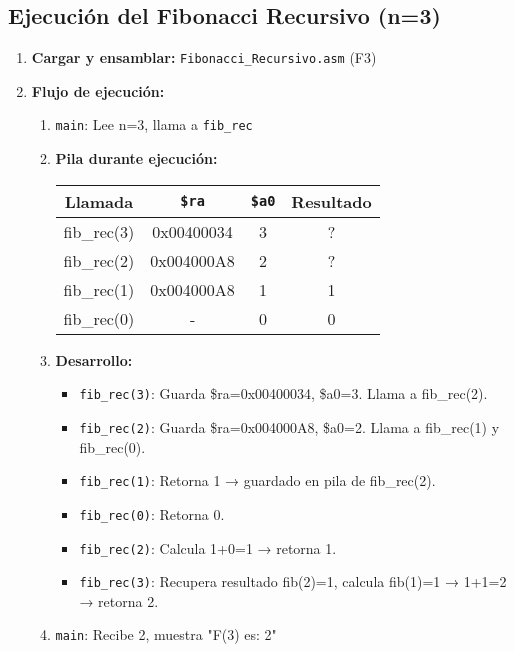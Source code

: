 \documentclass[a4paper, 12pt]{article}
\begin{document}
\subsection{Ejecución del Fibonacci Recursivo (n=3)}
\begin{enumerate}
    \item \textbf{Cargar y ensamblar:} \texttt{Fibonacci\_Recursivo.asm} (F3)
    \item \textbf{Flujo de ejecución:}
        \begin{enumerate}
            \item \texttt{main}: Lee n=3, llama a \texttt{fib\_rec}
            \item \textbf{Pila durante ejecución:}
                \begin{table}[h]
                    \centering
                    \begin{tabular}{|c|c|c|c|}
                        \hline
                        \textbf{Llamada} & \texttt{\$ra} & \texttt{\$a0} & \textbf{Resultado} \\
                        \hline
                        fib\_rec(3) & 0x00400034 & 3 & ? \\
                        \hline
                        fib\_rec(2) & 0x004000A8 & 2 & ? \\
                        \hline
                        fib\_rec(1) & 0x004000A8 & 1 & 1 \\
                        \hline
                        fib\_rec(0) & - & 0 & 0 \\
                        \hline
                    \end{tabular}
                \end{table}
            \item \textbf{Desarrollo:}
                \begin{itemize}
                    \item \texttt{fib\_rec(3)}: Guarda \$ra=0x00400034, \$a0=3. Llama a fib\_rec(2).
                    \item \texttt{fib\_rec(2)}: Guarda \$ra=0x004000A8, \$a0=2. Llama a fib\_rec(1) y fib\_rec(0).
                    \item \texttt{fib\_rec(1)}: Retorna 1 → guardado en pila de fib\_rec(2).
                    \item \texttt{fib\_rec(0)}: Retorna 0.
                    \item \texttt{fib\_rec(2)}: Calcula 1+0=1 → retorna 1.
                    \item \texttt{fib\_rec(3)}: Recupera resultado fib(2)=1, calcula fib(1)=1 → 1+1=2 → retorna 2.
                \end{itemize}
            \item \texttt{main}: Recibe 2, muestra "F(3) es: 2"
        \end{enumerate}
\end{enumerate}
\end{document}
